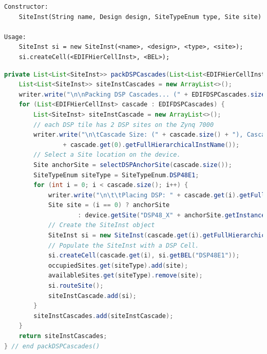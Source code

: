 \begin{lstlisting}[caption=\texttt{SiteInst} construction and BEL population.]
Constructor: 
    SiteInst(String name, Design design, SiteTypeEnum type, Site site)

Usage:
    SiteInst si = new SiteInst(<name>, <design>, <type>, <site>);
    si.createCell(<EDIFHierCellInst>, <BEL>);
\end{lstlisting}




\begin{lstlisting}[language=java, caption={Packing DSPCascades into \texttt{DSP48E1} \texttt{SiteInst}s.}, label={lst:carry_chains}]
private List<List<SiteInst>> packDSPCascades(List<List<EDIFHierCellInst>> EDIFDSPCascades) throws IOException {
    List<List<SiteInst>> siteInstCascades = new ArrayList<>();
    writer.write("\n\nPacking DSP Cascades... (" + EDIFDSPCascades.size() + ")");
    for (List<EDIFHierCellInst> cascade : EDIFDSPCascades) {
        List<SiteInst> siteInstCascade = new ArrayList<>();
        // each DSP tile has 2 DSP sites on the Zynq 7000
        writer.write("\n\tCascade Size: (" + cascade.size() + "), Cascade Anchor: "
                + cascade.get(0).getFullHierarchicalInstName());
        // Select a Site location on the device. 
        Site anchorSite = selectDSPAnchorSite(cascade.size());
        SiteTypeEnum siteType = SiteTypeEnum.DSP48E1;
        for (int i = 0; i < cascade.size(); i++) {
            writer.write("\n\t\tPlacing DSP: " + cascade.get(i).getFullHierarchicalInstName());
            Site site = (i == 0) ? anchorSite
                    : device.getSite("DSP48_X" + anchorSite.getInstanceX() + "Y" + (anchorSite.getInstanceY() + i));
            // Create the SiteInst object
            SiteInst si = new SiteInst(cascade.get(i).getFullHierarchicalInstName(), design, siteType, site);
            // Populate the SiteInst with a DSP Cell. 
            si.createCell(cascade.get(i), si.getBEL("DSP48E1"));
            occupiedSites.get(siteType).add(site);
            availableSites.get(siteType).remove(site);
            si.routeSite();
            siteInstCascade.add(si);
        }
        siteInstCascades.add(siteInstCascade);
    }
    return siteInstCascades;
} // end packDSPCascades()
\end{lstlisting}

